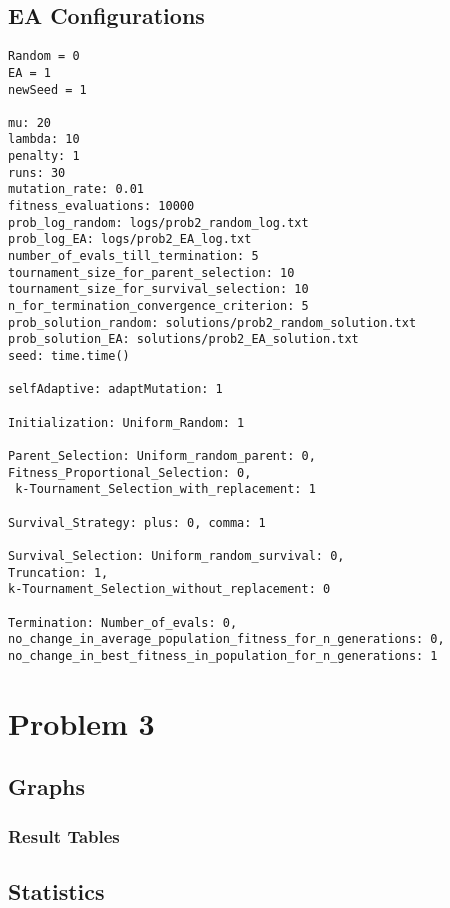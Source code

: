\documentclass[•]{article}
\begin{document}
\subsection{EA Configurations}
\begin{lstlisting}
Random = 0
EA = 1
newSeed = 1

mu: 20
lambda: 10
penalty: 1
runs: 30
mutation_rate: 0.01
fitness_evaluations: 10000
prob_log_random: logs/prob2_random_log.txt
prob_log_EA: logs/prob2_EA_log.txt
number_of_evals_till_termination: 5
tournament_size_for_parent_selection: 10
tournament_size_for_survival_selection: 10
n_for_termination_convergence_criterion: 5
prob_solution_random: solutions/prob2_random_solution.txt
prob_solution_EA: solutions/prob2_EA_solution.txt
seed: time.time()

selfAdaptive: adaptMutation: 1

Initialization: Uniform_Random: 1

Parent_Selection: Uniform_random_parent: 0, Fitness_Proportional_Selection: 0,
 k-Tournament_Selection_with_replacement: 1

Survival_Strategy: plus: 0, comma: 1

Survival_Selection: Uniform_random_survival: 0, 
Truncation: 1, 
k-Tournament_Selection_without_replacement: 0

Termination: Number_of_evals: 0, no_change_in_average_population_fitness_for_n_generations: 0, no_change_in_best_fitness_in_population_for_n_generations: 1
\end{lstlisting}

\section{Problem 3}
\subsection{Graphs}
\subsubsection{Result Tables}
\subsection{Statistics}
\end{document}
